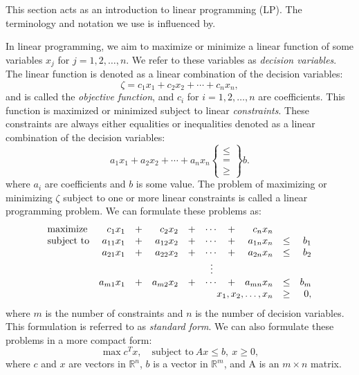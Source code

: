 This section acts as an introduction to linear programming (LP). The terminology and
notation we use is influenced by\cite{vanderbei}.

In linear programming, we aim to maximize or minimize a linear function of
some variables $x_j$ for $j=1,2,\ldots,n$. We refer to these variables as
\textit{decision variables}. The linear function is denoted as a linear
combination of the decision variables:
\[
\zeta = c_1 x_1 + c_2 x_2 + \cdots + c_n x_n,
\]
and is called the \textit{objective function}, and $c_i$ for $i=1,2,\ldots,n$
are coefficients.
This function is maximized
or minimized subject to linear \textit{constraints}. These constraints are
always either equalities or inequalities denoted as a linear combination
of the decision variables:
\[
a_1x_1 + a_2 x_2 + \cdots + a_n x_n \left\{\begin{array}{c} \leq \\ = \\ \geq \end{array}\right\} b.
\]
where $a_i$ are coefficients and $b$ is some value.
The problem of maximizing or minimizing $\zeta$ subject to one or more
linear constraints is called a linear programming problem.
We can formulate these problems as:
\[
\begin{array}{lrcrcccrcr}
\textrm{maximize}   & c_1 x_1    &+& c_2 x_2    &+& \cdots &+& c_n x_n               \\
\textrm{subject to} & a_{11} x_1 &+& a_{12} x_2 &+& \cdots &+& a_{1n} x_n &\leq& b_1 \\
                    & a_{21} x_1 &+& a_{22} x_2 &+& \cdots &+& a_{2n} x_n &\leq& b_2 \\
                    &            & &            & & \vdots & &            &    &     \\
                    & a_{m1} x_1 &+& a_{m2} x_2 &+& \cdots &+& a_{mn} x_n &\leq& b_m \\
                    \multicolumn{8}{r}{x_1,x_2,\ldots,x_n} &\geq& 0,
\end{array}
\]
where $m$ is the number of constraints and $n$ is the number of decision variables.
This formulation is referred to as \textit{standard form}\cite{vanderbei}.
We can also formulate these problems in a more compact form:
\[
\max{c^T x},\quad \textrm{subject to}~Ax \leq b, ~ x \geq 0,
\]
where $c$ and $x$ are vectors in $\mathbb{R}^n$, $b$ is a vector in $\mathbb{R}^m$, and
A is an $m \times n$ matrix.


